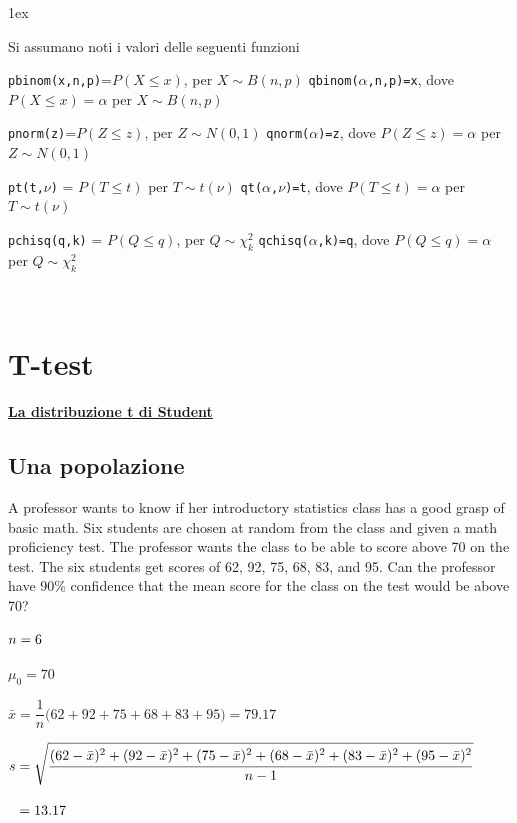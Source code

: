 \documentclass[12pt,openany]{book}
\theoremstyle{mio}
\theoremstyle{liscio}
\begin{document}
\parskip1ex
{\hrulefill\scriptsize

Si assumano noti i valori delle seguenti funzioni

{\tt pbinom(x,n,p)}=$P(X\le x)$, per $X\sim B(n,p)$
\hfill 
{\tt qbinom($\alpha$,n,p)=x},  dove $P(X\le x)=\alpha$ per $X\sim B(n,p)$

{\tt pnorm(z)}=$P(Z\le z)$, per $Z\sim N(0,1)$
\hfill 
{\tt qnorm($\alpha$)=z},  dove $P(Z\le z)=\alpha$ per $Z\sim N(0,1)$

{\tt pt(t,$\nu$)} = $P(T\le t)$ per $T\sim t(\nu)$
\hfill
{\tt qt($\alpha$,$\nu$)=t}, dove $P(T\le t)=\alpha$ per $T\sim t(\nu)$

{\tt pchisq(q,k)} = $P(Q\le q)$, per $Q\sim \chi^2_k$
\hfill
{\tt qchisq($\alpha$,k)=q},  dove $P(Q\le q)=\alpha$ per $Q\sim \chi^2_k$
\par
}



\hfill{}\clearpage\
\section{T-test}
\label{T-test}
\hfill\textbf{{\color{brown}\hyperref[tStudent]{La distribuzione t di Student \faShare}}}
\subsection{Una popolazione}
A professor wants to know if her introductory statistics class has a good grasp of basic math. Six students are chosen at random from the class and given a math proficiency test. The professor wants the class to be able to score above 70 on the test. The six students get scores of 62, 92, 75, 68, 83, and 95. Can the professor have 90\%  confidence that the mean score for the class on the test would be above 70?

$\strut n=6$

$\mu_0=70$

$\bar x =\dfrac1n\big(62+92+75+68+83+95\big) =79.17$

$s = \sqrt{\dfrac{\strut(62-\bar x)^2+(92-\bar x)^2+(75-\bar x)^2+(68-\bar x)^2+(83-\bar x)^2+(95-\bar x)^2}{n-1}}$

$\strut\phantom{s} = 13.17$
\end{document}
